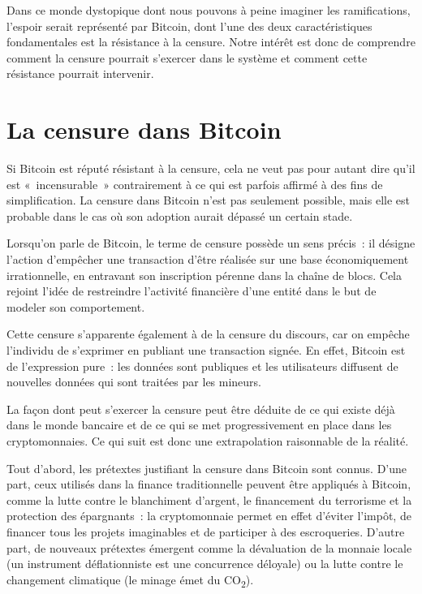 Dans ce monde dystopique dont nous pouvons à peine imaginer les ramifications, l'espoir serait représenté par Bitcoin, dont l'une des deux caractéristiques fondamentales est la résistance à la censure. Notre intérêt est donc de comprendre comment la censure pourrait s'exercer dans le système et comment cette résistance pourrait intervenir.

\section*{La censure dans Bitcoin}

Si Bitcoin est réputé résistant à la censure, cela ne veut pas pour autant dire qu'il est «~incensurable~» contrairement à ce qui est parfois affirmé à des fins de simplification. La censure dans Bitcoin n'est pas seulement possible, mais elle est probable dans le cas où son adoption aurait dépassé un certain stade.

Lorsqu'on parle de Bitcoin, le terme de censure possède un sens précis~: il désigne l'action d'empêcher une transaction d'être réalisée sur une base économiquement irrationnelle, en entravant son inscription pérenne dans la chaîne de blocs. Cela rejoint l'idée de restreindre l'activité financière d'une entité dans le but de modeler son comportement.

Cette censure s'apparente également à de la censure du discours, car on empêche l'individu de s'exprimer en publiant une transaction signée. En effet, Bitcoin est de l'expression pure~: les données sont publiques et les utilisateurs diffusent de nouvelles données qui sont traitées par les mineurs.

La façon dont peut s'exercer la censure peut être déduite de ce qui existe déjà dans le monde bancaire et de ce qui se met progressivement en place dans les cryptomonnaies. Ce qui suit est donc une extrapolation raisonnable de la réalité.

Tout d'abord, les prétextes justifiant la censure dans Bitcoin sont connus. D'une part, ceux utilisés dans la finance traditionnelle peuvent être appliqués à Bitcoin, comme la lutte contre le blanchiment d'argent, le financement du terrorisme et la protection des épargnants~: la cryptomonnaie permet en effet d'éviter l'impôt, de financer tous les projets imaginables et de participer à des escroqueries. D'autre part, de nouveaux prétextes émergent comme la dévaluation de la monnaie locale (un instrument déflationniste est une concurrence déloyale) ou la lutte contre le changement climatique (le minage émet du CO\textsubscript{2}).

